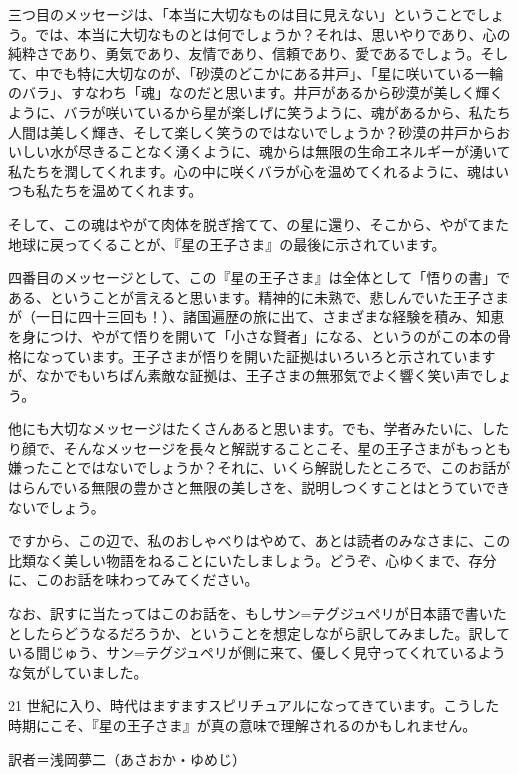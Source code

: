 三つ目のメッセージは、「本当に大切なものは目に見えない」ということでしょう。では、本当に大切なものとは何でしょうか？それは、思いやりであり、心の純粋さであり、勇気であり、友情であり、信頼であり、愛であるでしょう。そして、中でも特に大切なのが、「砂漠のどこかにある井戸」、「星に咲いている一輪のバラ」、すなわち「魂」なのだと思います。井戸があるから砂漠が美しく輝くように、バラが咲いているから星が楽しげに笑うように、魂があるから、私たち人間は美しく輝き、そして楽しく笑うのではないでしょうか？砂漠の井戸からおいしい水が尽きることなく湧くように、魂からは無限の生命エネルギーが湧いて私たちを潤してくれます。心の中に咲くバラが心を温めてくれるように、魂はいつも私たちを温めてくれます。

そして、この魂はやがて肉体を脱ぎ捨てて、の星に還り、そこから、やがてまた地球に戻ってくることが、『星の王子さま』の最後に示されています。

四番目のメッセージとして、この『星の王子さま』は全体として「悟りの書」である、ということが言えると思います。精神的に未熟で、悲しんでいた王子さまが（一日に四十三回も！）、諸国遍歴の旅に出て、さまざまな経験を積み、知恵を身につけ、やがて悟りを開いて「小さな賢者」になる、というのがこの本の骨格になっています。王子さまが悟りを開いた証拠はいろいろと示されていますが、なかでもいちばん素敵な証拠は、王子さまの無邪気でよく響く笑い声でしょう。

他にも大切なメッセージはたくさんあると思います。でも、学者みたいに、したり顔で、そんなメッセージを長々と解説することこそ、星の王子さまがもっとも嫌ったことではないでしょうか？それに、いくら解説したところで、このお話がはらんでいる無限の豊かさと無限の美しさを、説明しつくすことはとうていできないでしょう。

ですから、この辺で、私のおしゃべりはやめて、あとは読者のみなさまに、この比類なく美しい物語をねることにいたしましょう。どうぞ、心ゆくまで、存分に、このお話を味わってみてください。

なお、訳すに当たってはこのお話を、もしサン=テグジュペリが日本語で書いたとしたらどうなるだろうか、ということを想定しながら訳してみました。訳している間じゅう、サン=テグジュペリが側に来て、優しく見守ってくれているような気がしていました。

21 世紀に入り、時代はますますスピリチュアルになってきています。こうした時期にこそ、『星の王子さま』が真の意味で理解されるのかもしれません。


\startmakeup[title]

訳者＝浅岡夢二（あさおか・ゆめじ）

